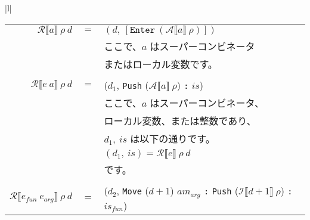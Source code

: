 \documentclass{jarticle}
\begin{document}
\begin{tabular} {|l|}
\begin{tabular}{r c l}
		\\
		$\mathcal{R} \llbracket a \rrbracket ~ \rho ~ d$                 & $=$ & $(d, ~ \left[ \texttt{Enter} ~ (\mathcal{A} \llbracket a \rrbracket ~ \rho) \right])$                                                         \\
		                                                                 &     & ここで、$a$ はスーパーコンビネータ                                                                                                            \\
		                                                                 &     & またはローカル変数です。                                                                                                                      \\
		\\
		$\mathcal{R} \llbracket e ~ a \rrbracket ~ \rho ~ d$             & $=$ & ($d_1$, \texttt{Push} ($\mathcal{A} \llbracket a \rrbracket ~ \rho$) \texttt{:} $is$)                                                         \\
		                                                                 &     & ここで、$a$ はスーパーコンビネータ、                                                                                                          \\
		                                                                 &     & ローカル変数、または整数であり、                                                                                                              \\
		                                                                 &     & $d_1, ~ is$ は以下の通りです。                                                                                                                \\
		                                                                 &     & $(d_1, ~ is) = \mathcal{R} \llbracket e \rrbracket ~ \rho ~ d$                                                                                \\
		                                                                 &     & です。                                                                                                                                        \\
		\\
		$\mathcal{R} \llbracket e_{fun} ~ e_{arg} \rrbracket ~ \rho ~ d$ & $=$ & ($d_2$, \texttt{Move} ($d + 1$) $am_{arg}$ \texttt{:} \texttt{Push} ($\mathcal{I} \llbracket d + 1 \rrbracket ~ \rho$) \texttt{:} $is_{fun}$) \\

\end{tabular}
\end{tabular}
\end{document}

